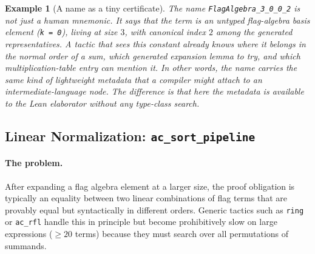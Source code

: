 \documentclass{article}
\newtheorem{example}[theorem]{Example}
\newcommand{\lean}[1]{\texttt{#1}}
\begin{document}
\begin{example}[A name as a tiny certificate]
  The name \lean{FlagAlgebra\_3\_0\_0\_2} is not just a human mnemonic.  It says
  that the term is an untyped flag-algebra basis element (\lean{k = 0}), living
  at size $3$, with canonical index $2$ among the generated representatives.
  A tactic that sees this constant already knows where it belongs in the
  normal order of a sum, which generated expansion lemma to try, and which
  multiplication-table entry can mention it.  In other words, the name carries
  the same kind of lightweight metadata that a compiler might attach to an
  intermediate-language node.  The difference is that here the metadata is
  available to the Lean elaborator without any type-class search.
\end{example}

\subsection{Linear Normalization: \lean{ac\_sort\_pipeline}}

\paragraph{The problem.}
After expanding a flag algebra element at a larger size, the proof obligation
is typically an equality between two linear combinations of flag terms that are
provably equal but syntactically in different orders.  Generic tactics such as
\lean{ring} or \lean{ac\_rfl} handle this in principle but become prohibitively
slow on large expressions ($\geq 20$ terms) because they must search over all
permutations of summands.
\end{document}
